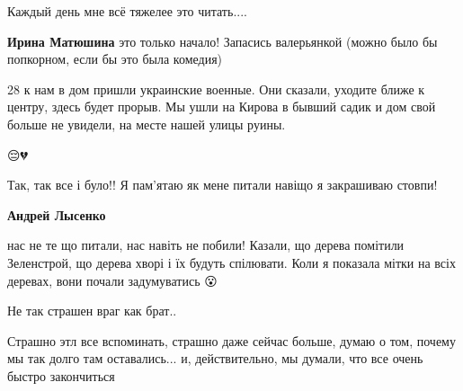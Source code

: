  
 
 
 
 

\qqSecCmt


Каждый день мне всё тяжелее это читать....

\begin{itemize} %
\textbf{Ирина Матюшина} это только начало! Запасись валерьянкой (можно было бы попкорном, если бы это была комедия)
\end{itemize} %


28 к нам в дом пришли украинские военные. Они сказали, уходите ближе к центру,
здесь будет прорыв. Мы ушли на Кирова в бывший садик и дом свой больше не
увидели, на месте нашей улицы руины.


😔💔


Так, так все і було!! Я пам'ятаю як мене питали навіщо я закрашиваю стовпи!

\begin{itemize} %
\textbf{Андрей Лысенко} 

нас не те що питали, нас навіть не побили! Казали, що дерева помітили
Зеленстрой, що дерева хворі і їх будуть спілювати. Коли я показала мітки на
всіх деревах, вони почали задумуватись 😮🙅

\end{itemize} %


Не так страшен враг как брат..


Страшно этл все вспоминать, страшно даже сейчас больше, думаю о том, почему мы
так долго там оставались... и, действительно, мы думали, что все очень быстро
закончиться

